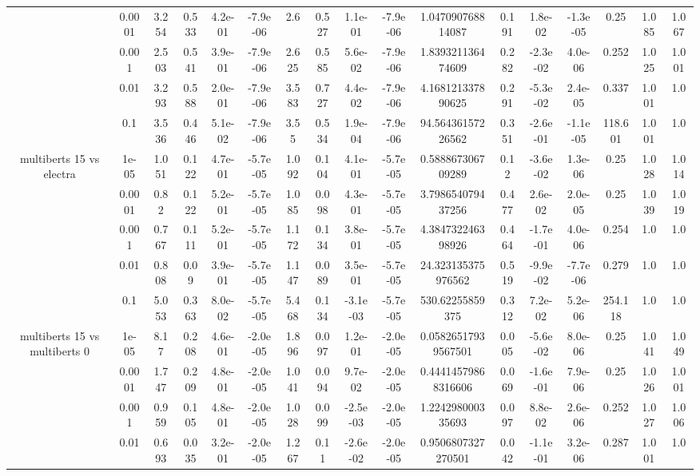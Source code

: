 \begin{tabular}{|c|c|c|c|c|c|c|c|c|c|c|c|c|c|c|c|c|}
 & 0.0001 & 3.254 & 0.533 & 4.2e-01 & -7.9e-06 & 2.6 & 0.527 & 1.1e-01 & -7.9e-06 & 1.047090768814087 & 0.191 & 1.8e-02 & -1.3e-05 & 0.25 & 1.085 & 1.067 \\
 & 0.001 & 2.503 & 0.541 & 3.9e-01 & -7.9e-06 & 2.625 & 0.585 & 5.6e-02 & -7.9e-06 & 1.839321136474609 & 0.282 & -2.3e-02 & 4.0e-06 & 0.252 & 1.025 & 1.001 \\
 & 0.01 & 3.293 & 0.588 & 2.0e-01 & -7.9e-06 & 3.583 & 0.727 & 4.4e-02 & -7.9e-06 & 4.168121337890625 & 0.291 & -5.3e-02 & 2.4e-05 & 0.337 & 1.001 & 1.0 \\
 & 0.1 & 3.536 & 0.446 & 5.1e-02 & -7.9e-06 & 3.55 & 0.534 & 1.9e-04 & -7.9e-06 & 94.56436157226562 & 0.351 & -2.6e-01 & -1.1e-05 & 118.601 & 1.001 & 1.0 \\
\hline
\multirow{5}{*}{multiberts 15 vs electra } & 1e-05 & 1.051 & 0.122 & 4.7e-01 & -5.7e-05 & 1.092 & 0.104 & 4.1e-01 & -5.7e-05 & 0.588867306709289 & 0.12 & -3.6e-02 & 1.3e-06 & 0.25 & 1.028 & 1.014 \\
 & 0.0001 & 0.82 & 0.122 & 5.2e-01 & -5.7e-05 & 1.085 & 0.098 & 4.3e-01 & -5.7e-05 & 3.798654079437256 & 0.477 & 2.6e-02 & 2.0e-05 & 0.25 & 1.039 & 1.019 \\
 & 0.001 & 0.767 & 0.111 & 5.2e-01 & -5.7e-05 & 1.172 & 0.134 & 3.8e-01 & -5.7e-05 & 4.384732246398926 & 0.464 & -1.7e-01 & 4.0e-06 & 0.254 & 1.0 & 1.0 \\
 & 0.01 & 0.808 & 0.09 & 3.9e-01 & -5.7e-05 & 1.147 & 0.089 & 3.5e-01 & -5.7e-05 & 24.323135375976562 & 0.519 & -9.9e-02 & -7.7e-06 & 0.279 & 1.0 & 1.0 \\
 & 0.1 & 5.053 & 0.363 & 8.0e-02 & -5.7e-05 & 5.468 & 0.134 & -3.1e-03 & -5.7e-05 & 530.62255859375 & 0.312 & 7.2e-02 & 5.2e-06 & 254.118 & 1.0 & 1.0 \\
\hline
\multirow{5}{*}{multiberts 15 vs multiberts 0} & 1e-05 & 8.17 & 0.208 & 4.6e-01 & -2.0e-05 & 1.896 & 0.097 & 1.2e-01 & -2.0e-05 & 0.05826517939567501 & 0.005 & -5.6e-02 & 8.0e-06 & 0.25 & 1.041 & 1.049 \\
 & 0.0001 & 1.747 & 0.209 & 4.8e-01 & -2.0e-05 & 1.041 & 0.094 & 9.7e-02 & -2.0e-05 & 0.44414579868316606 & 0.069 & -1.6e-01 & 7.9e-06 & 0.25 & 1.026 & 1.001 \\
 & 0.001 & 0.959 & 0.105 & 4.8e-01 & -2.0e-05 & 1.028 & 0.099 & -2.5e-03 & -2.0e-05 & 1.224298000335693 & 0.097 & 8.8e-02 & 2.6e-06 & 0.252 & 1.027 & 1.006 \\
 & 0.01 & 0.693 & 0.035 & 3.2e-01 & -2.0e-05 & 1.267 & 0.11 & -2.6e-02 & -2.0e-05 & 0.9506807327270501 & 0.042 & -1.1e-01 & 3.2e-06 & 0.287 & 1.001 & 1.0 \\

\end{tabular}
